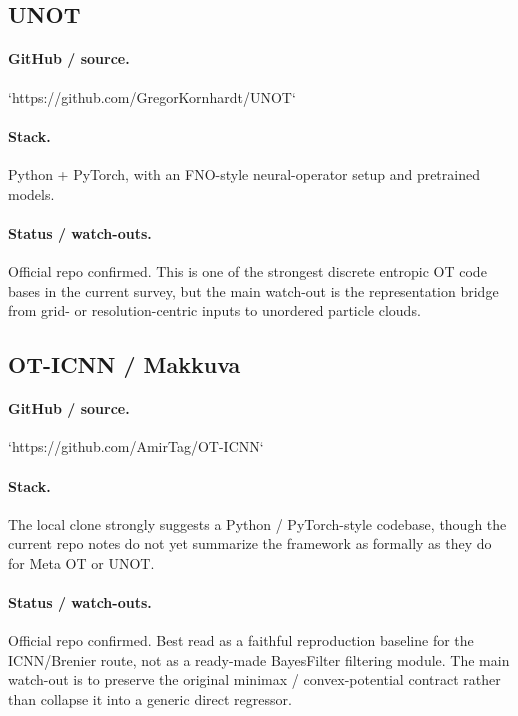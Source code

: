 \documentclass[11pt]{report}
\begin{document}
\subsection*{UNOT}
\paragraph{GitHub / source.}
`https://github.com/GregorKornhardt/UNOT`

\paragraph{Stack.}
Python + PyTorch, with an FNO-style neural-operator setup and pretrained models.

\paragraph{Status / watch-outs.}
Official repo confirmed.  This is one of the strongest discrete entropic OT code
bases in the current survey, but the main watch-out is the representation bridge
from grid- or resolution-centric inputs to unordered particle clouds.

\subsection*{OT-ICNN / Makkuva}
\paragraph{GitHub / source.}
`https://github.com/AmirTag/OT-ICNN`

\paragraph{Stack.}
The local clone strongly suggests a Python / PyTorch-style codebase, though the
current repo notes do not yet summarize the framework as formally as they do for
Meta OT or UNOT.

\paragraph{Status / watch-outs.}
Official repo confirmed.  Best read as a faithful reproduction baseline for the
ICNN/Brenier route, not as a ready-made BayesFilter filtering module.  The main
watch-out is to preserve the original minimax / convex-potential contract rather
than collapse it into a generic direct regressor.
\end{document}
